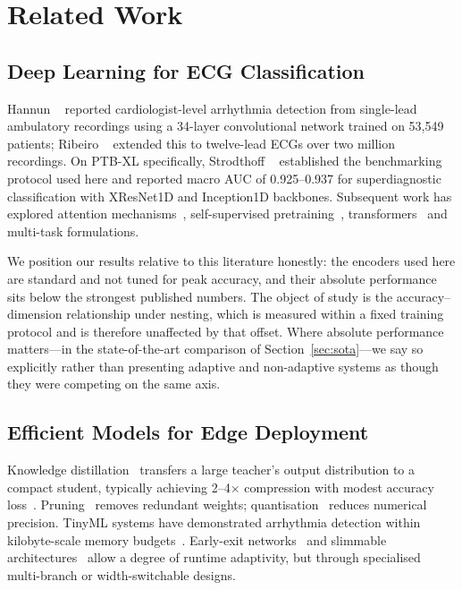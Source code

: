 \section{Related Work}

\subsection{Deep Learning for ECG Classification}

Hannun \etal~\cite{hannun2019} reported cardiologist-level arrhythmia
detection from single-lead ambulatory recordings using a 34-layer
convolutional network trained on 53{,}549 patients; Ribeiro
\etal~\cite{ribeiro2020} extended this to twelve-lead ECGs over two million
recordings. On PTB-XL specifically, Strodthoff \etal~\cite{strodthoff2021}
established the benchmarking protocol used here and reported macro AUC of
0.925--0.937 for superdiagnostic classification with XResNet1D and
Inception1D backbones. Subsequent work has explored attention
mechanisms~\cite{yao2020}, self-supervised pretraining~\cite{kiyasseh2021},
transformers~\cite{yan2019,natarajan2020} and multi-task formulations.

We position our results relative to this literature honestly: the encoders
used here are standard and not tuned for peak accuracy, and their absolute
performance sits below the strongest published numbers. The object of study is
the accuracy--dimension relationship under nesting, which is measured within a
fixed training protocol and is therefore unaffected by that offset. Where
absolute performance matters---in the state-of-the-art comparison of
Section~\ref{sec:sota}---we say so explicitly rather than presenting adaptive
and non-adaptive systems as though they were competing on the same axis.

\subsection{Efficient Models for Edge Deployment}

Knowledge distillation~\cite{hinton2015} transfers a large teacher's output
distribution to a compact student, typically achieving 2--4$\times$
compression with modest accuracy loss~\cite{li2023kd}. Pruning~\cite{han2016}
removes redundant weights; quantisation~\cite{jacob2018} reduces numerical
precision. TinyML systems have demonstrated arrhythmia detection within
kilobyte-scale memory budgets~\cite{sakr2023,banbury2020}. Early-exit
networks~\cite{teerapittayanon2016} and slimmable
architectures~\cite{yu2019} allow a degree of runtime adaptivity, but through
specialised multi-branch or width-switchable designs.

